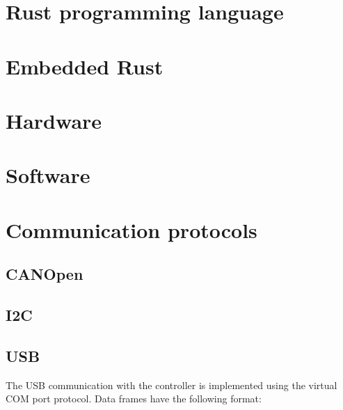 \section{Rust programming language}

\section{Embedded Rust}

\section{Hardware}

\section{Software}

\section{Communication protocols}
\subsection{CANOpen}
\subsection{I2C}
\subsection{USB}
The USB communication with the controller is implemented using the virtual COM port protocol.
Data frames have the following format:
